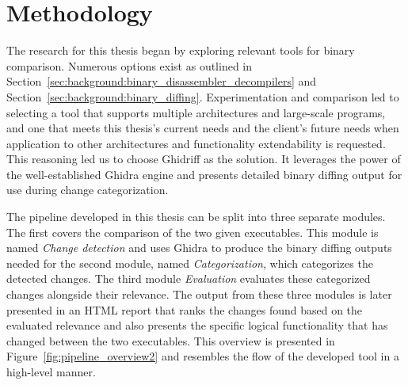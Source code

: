 
\chapter{Methodology}
\label{cha:methodology}

The research for this thesis began by exploring relevant tools for binary comparison. Numerous options exist as outlined in Section~\ref{sec:background:binary_disassembler_decompilers} and Section~\ref{sec:background:binary_diffing}. Experimentation and comparison led to selecting a tool that supports multiple architectures and large-scale programs, and one that meets this thesis's current needs and the client's future needs when application to other architectures and functionality extendability is requested. This reasoning led us to choose Ghidriff as the solution. It leverages the power of the well-established Ghidra engine and presents detailed binary diffing output for use during change categorization.



\label{sec:method:overview}
The pipeline developed in this thesis can be split into three separate modules. The first covers the comparison of the two given executables. This module is named \textit{Change detection} and uses Ghidra to produce the binary diffing outputs needed for the second module, named \textit{Categorization}, which categorizes the detected changes. The third module \textit{Evaluation} evaluates these categorized changes alongside their relevance. The output from these three modules is later presented in an HTML report that ranks the changes found based on the evaluated relevance and also presents the specific logical functionality that has changed between the two executables. This overview is presented in Figure~\ref{fig:pipeline_overview2} and resembles the flow of the developed tool in a high-level manner.

